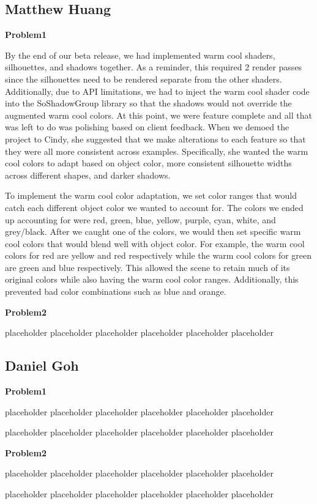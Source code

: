 \documentclass[10pt,journal,compsoc,draftclsnofoot]{IEEEtran}
\begin{document}
\begin{flushleft}
\newpage

\subsection{Matthew Huang}
\textbf{Problem1}
\par
By the end of our beta release, we had implemented warm cool shaders, silhouettes, and shadows together.
As a reminder, this required 2 render passes since the silhouettes need to be rendered separate from the other shaders.
Additionally, due to API limitations, we had to inject the warm cool shader code into the SoShadowGroup library so that the shadows would not override the augmented warm cool colors.
At this point, we were feature complete and all that was left to do was polishing based on client feedback.
When we demoed the project to Cindy, she suggested that we make alterations to each feature so that they were all more consistent across examples.
Specifically, she wanted the warm cool colors to adapt based on object color, more consistent silhouette widths across different shapes, and darker shadows.
\par
To implement the warm cool color adaptation, we set color ranges that would catch each different object color we wanted to account for.
The colors we ended up accounting for were red, green, blue, yellow, purple, cyan, white, and grey/black.
After we caught one of the colors, we would then set specific warm cool colors that would blend well with object color.
For example, the warm cool colors for red are yellow and red respectively while the warm cool colors for green are green and blue respectively.
This allowed the scene to retain much of its original colors while also having the warm cool color ranges.
Additionally, this prevented bad color combinations such as blue and orange.

\vspace{3mm}

\textbf{Problem2}
\par
placeholder placeholder placeholder placeholder placeholder placeholder

\newpage

\subsection{Daniel Goh}
\textbf{Problem1}
\par
placeholder placeholder placeholder placeholder placeholder placeholder
\par
placeholder placeholder placeholder placeholder placeholder placeholder

\vspace{3mm}

\textbf{Problem2}
\par
placeholder placeholder placeholder placeholder placeholder placeholder
\par
placeholder placeholder placeholder placeholder placeholder placeholder

\newpage

\null
\vfill

\end{flushleft}
\end{document}
